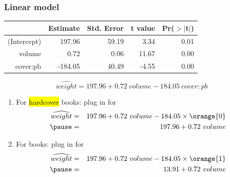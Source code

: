 
\begin{frame}
\frametitle{Linear model}

{\small
\begin{center}
\begin{tabular}{rrrrr}
  \hline
 & Estimate & Std. Error & t value & Pr($>$$|$t$|$) \\ 
  \hline
(Intercept) & 197.96 & 59.19 & 3.34 & 0.01 \\ 
  volume & 0.72 & 0.06 & 11.67 & 0.00 \\ 
  cover:pb & -184.05 & 40.49 & -4.55 & 0.00 \\ 
   \hline
\end{tabular}
\end{center}
}

\pause

\[ \widehat{weight} = 197.96 + 0.72~volume - 184.05~cover:pb  \]

\pause

\begin{enumerate}

\item For \hl{hardcover} books: plug in  for 
\begin{eqnarray*}
\widehat{weight} &=& 197.96 + 0.72~volume - 184.05 \times \orange{0} \\
\pause
&=& 197.96 +  0.72~volume
\end{eqnarray*}

\pause

\item For  books: plug in  for 
\begin{eqnarray*}
\widehat{weight} &=& 197.96 + 0.72~volume - 184.05 \times \orange{1} \\
\pause
&=& 13.91 +  0.72~volume
\end{eqnarray*}

\end{enumerate}

\end{frame}



